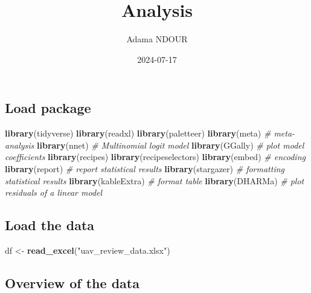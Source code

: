 \documentclass[
]{article}
\title{Analysis}
\author{Adama NDOUR}
\date{2024-07-17}
\newenvironment{Shaded}{\begin{snugshade}}{\end{snugshade}}
\newcommand{\CommentTok}[1]{\textcolor[rgb]{0.56,0.35,0.01}{\textit{#1}}}
\newcommand{\FunctionTok}[1]{\textcolor[rgb]{0.13,0.29,0.53}{\textbf{#1}}}
\newcommand{\NormalTok}[1]{#1}
\newcommand{\OtherTok}[1]{\textcolor[rgb]{0.56,0.35,0.01}{#1}}
\newcommand{\StringTok}[1]{\textcolor[rgb]{0.31,0.60,0.02}{#1}}
\begin{document}
\maketitle

\hypertarget{load-package}{%
\subsection{Load package}\label{load-package}}

\begin{Shaded}
\begin{Highlighting}[]
\FunctionTok{library}\NormalTok{(tidyverse)}
\FunctionTok{library}\NormalTok{(readxl)}
\FunctionTok{library}\NormalTok{(paletteer)}
\FunctionTok{library}\NormalTok{(meta) }\CommentTok{\# meta{-}analysis}
\FunctionTok{library}\NormalTok{(nnet) }\CommentTok{\# Multinomial logit model}
\FunctionTok{library}\NormalTok{(GGally) }\CommentTok{\# plot model coefficients}
\FunctionTok{library}\NormalTok{(recipes)}
\FunctionTok{library}\NormalTok{(recipeselectors)}
\FunctionTok{library}\NormalTok{(embed) }\CommentTok{\# encoding}
\FunctionTok{library}\NormalTok{(report) }\CommentTok{\# report statistical results}
\FunctionTok{library}\NormalTok{(stargazer) }\CommentTok{\# formatting statistical results}
\FunctionTok{library}\NormalTok{(kableExtra) }\CommentTok{\# format table}
\FunctionTok{library}\NormalTok{(DHARMa) }\CommentTok{\# plot residuals of a linear model}
\end{Highlighting}
\end{Shaded}

\hypertarget{load-the-data}{%
\subsection{Load the data}\label{load-the-data}}

\begin{Shaded}
\begin{Highlighting}[]
\NormalTok{df }\OtherTok{\textless{}{-}} \FunctionTok{read\_excel}\NormalTok{(}\StringTok{"uav\_review\_data.xlsx"}\NormalTok{)}
\end{Highlighting}
\end{Shaded}

\hypertarget{overview-of-the-data}{%
\subsection{Overview of the data}\label{overview-of-the-data}}
\end{document}
